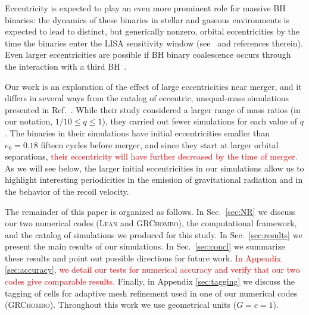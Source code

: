 \documentclass[floats,floatfix,showpacs,amssymb,prd,twocolumn,superscriptaddress,nofootinbib,nolongbibliography,reprint]{revtex4-2}
\newcommand{\mr}[1]{{\textcolor{cyan}{\sf{[MR: #1]}} }}
\newcommand{\eb}[1]{{\textcolor{blue}{\sf{[EB: #1]}} }}
\newcommand{\new}[1]{{\textcolor{red}{ #1} }}
\begin{document}
Eccentricity is expected to play an even more prominent role for
massive BH binaries: the dynamics of these binaries in stellar and
gaseous environments is expected to lead to distinct, but generically
nonzero, orbital eccentricities by the time the binaries enter the
LISA sensitivity window (see~\cite{Roedig:2011rn} and references
therein). Even larger eccentricities are possible if BH binary
coalescence occurs through the interaction with a third
BH~\cite{Bonetti:2018tpf}.

Our work is an exploration of the effect of large eccentricities near
merger, and it differs in several ways from the catalog of eccentric,
unequal-mass simulations presented in Ref.~\cite{Huerta:2019oxn}.
While their study considered a larger range of mass ratios (in our
notation, $1/10\leq q\leq 1$), they carried out fewer simulations for
each value of $q$. The binaries in their simulations have initial
eccentricities smaller than $e_0 = 0.18$ fifteen cycles before merger,
and since they start at larger orbital separations,
\new{their eccentricity will have further decreased by the time of merger.}
As we will see below, the larger initial eccentricities in
our simulations allow us to highlight interesting periodicities in the
emission of gravitational radiation and in the behavior of the recoil
velocity.

The remainder of this paper is organized as follows.
%
In Sec.~\ref{sec:NR} we discuss our two numerical codes (\textsc{Lean}
and \textsc{GRChombo}), the computational framework, and the catalog
of simulations we produced for this study. In Sec.~\ref{sec:results}
we present the main results of our simulations. In
Sec.~\ref{sec:concl} we summarize these results and point out possible
directions for future work. \new{In Appendix \ref{sec:accuracy}, we
detail our tests for numerical accuracy and verify that
our two codes give comparable results.}
Finally, in Appendix \ref{sec:tagging} we 
discuss the tagging of cells for adaptive mesh refinement used in one
of our numerical codes (\textsc{GRChombo}).
%
Throughout this work we use geometrical units ($G=c=1$).
\end{document}

